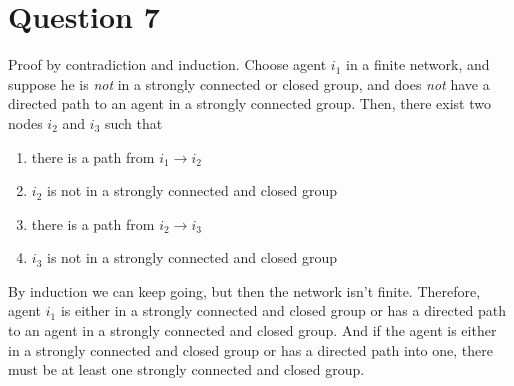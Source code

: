 \section*{Question 7}
Proof by contradiction and induction. Choose agent $i_1$ in a finite network, and suppose he is \emph{not} in a strongly connected or closed group, and does \emph{not} have a directed path to an agent in a strongly connected group. Then, there exist two nodes $i_2$ and $i_3$ such that
\begin{enumerate}
\item there is a path from $i_1 \to i_2$
\item $i_2$ is not in a strongly connected and closed group
\item there is a path from $i_2 \to i_3$
  \item $i_3$ is not in a strongly connected and closed group
\end{enumerate}
By induction we can keep going, but then the network isn't finite. Therefore, agent $i_1$ is either in a strongly connected and closed group or has a directed path to an agent in a strongly connected and closed group. And if the agent is either in a strongly connected and closed group or has a directed path into one, there must be at least one strongly connected and closed group.

